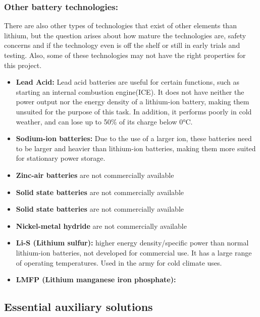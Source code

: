 \documentclass{article}
\begin{document}
\subsubsection*{Other battery technologies: }

There are also other types of technologies that exist of other elements than lithium, but the question arises about how mature the technologies are, safety concerns and if the technology even is off the shelf or still in early trials and testing. Also, some of these technologies may not have the right properties for this project.

\begin{itemize}
    \item \textbf{Lead Acid:} Lead acid batteries are useful for certain functions, such as starting an internal combustion engine(ICE). It does not have neither the power output nor the energy density of a lithium-ion battery, making them unsuited for the purpose of this task. In addition, it performs poorly in cold weather, and can lose up to 50\% of its charge below 0°C.
    \item \textbf{Sodium-ion batteries:} Due to the use of a larger ion, these batteries need to be larger and heavier than lithium-ion batteries, making them more suited for stationary power storage.
    \item \textbf{Zinc-air batteries} are not commercially available
    \item \textbf{Solid state batteries} are not commercially available
    \item \textbf{Solid state batteries} are not commercially available
    \item \textbf{Nickel-metal hydride} are not commercially available
    \item \textbf{Li-S (Lithium sulfur):} higher energy density/specific power than normal lithium-ion batteries, not developed for commercial use. It has a large range of
    operating temperatures. Used in the army for cold climate uses.
    \item \textbf{LMFP (Lithium manganese iron phosphate): } \cite{pandaily}
    
    
\end{itemize}
 

\subsection*{Essential auxiliary solutions}
\end{document}
